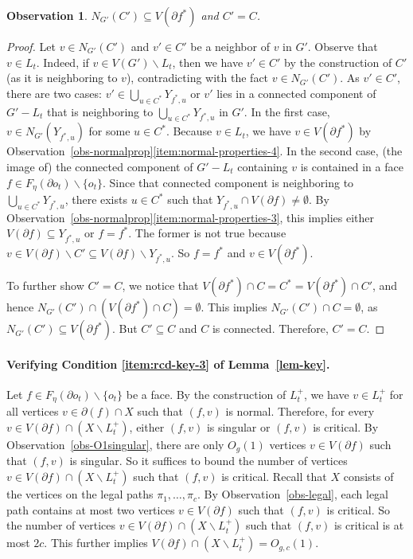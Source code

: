 \documentclass[a4paper,11pt]{article}
\numberwithin{lemma}{section}
\newtheorem{observation}[lemma]{Observation}
\begin{document}
\begin{observation}
$N_{G'}(C') \subseteq V(\partial f^*)$ and $C' = C$.
\end{observation}
\begin{proof}
Let $v \in N_{G'}(C')$ and $v' \in C'$ be a neighbor of $v$ in $G'$.
Observe that $v \in L_t$.
Indeed, if $v \in V(G') \backslash L_t$, then we have $v' \in C'$ by the construction of $C'$ (as it is neighboring to $v$), contradicting with the fact $v \in N_{G'}(C')$.
As $v' \in C'$, there are two cases: $v' \in \bigcup_{u \in C^*} Y_{f^*,u}$ or $v'$ lies in a connected component of $G' - L_t$ that is neighboring to $\bigcup_{u \in C^*} Y_{f^*,u}$ in $G'$.
In the first case, $v \in N_{G'}(Y_{f^*,u})$ for some $u \in C^*$.
Because $v \in L_t$, we have $v \in V(\partial f^*)$ by Observation~\ref{obs-normalprop}\ref{item:normal-properties-4}.
In the second case, (the image of) the connected component of $G' - L_t$ containing $v$ is contained in a face $f \in F_\eta(\partial o_t) \backslash \{o_t\}$.
Since that connected component is neighboring to $\bigcup_{u \in C^*} Y_{f^*,u}$, there exists $u \in C^*$ such that $Y_{f^*,u} \cap V(\partial f) \neq \emptyset$.
By Observation~\ref{obs-normalprop}\ref{item:normal-properties-3}, this implies either $V(\partial f) \subseteq Y_{f^*,u}$ or $f = f^*$.
The former is not true because $v \in V(\partial f) \backslash C' \subseteq V(\partial f) \backslash Y_{f^*,u}$.
So $f = f^*$ and $v \in V(\partial f^*)$.

To further show $C' = C$, we notice that $V(\partial f^*) \cap C = C^* = V(\partial f^*) \cap C'$, and hence $N_{G'}(C') \cap (V(\partial f^*) \cap C) = \emptyset$.
This implies $N_{G'}(C') \cap C = \emptyset$, as $N_{G'}(C') \subseteq V(\partial f^*)$.
But $C' \subseteq C$ and $C$ is connected.
Therefore, $C' = C$.
\end{proof}

\paragraph{Verifying Condition \ref{item:rcd-key-3} of Lemma~\ref{lem-key}.}
Let $f \in F_\eta(\partial o_t) \backslash \{o_t\}$ be a face.
By the construction of $L_t^+$, we have $v \in L_t^+$ for all vertices $v \in \partial (f) \cap X$ such that $(f,v)$ is normal.
Therefore, for every $v \in V(\partial f) \cap (X \backslash L_t^+)$, either $(f,v)$ is singular or $(f,v)$ is critical.
By Observation~\ref{obs-O1singular}, there are only $O_g(1)$ vertices $v \in V(\partial f)$ such that $(f,v)$ is singular.
So it suffices to bound the number of vertices $v \in V(\partial f) \cap (X \backslash L_t^+)$ such that $(f,v)$ is critical.
Recall that $X$ consists of the vertices on the legal paths $\pi_1,\dots,\pi_c$.
By Observation~\ref{obs-legal}, each legal path contains at most two vertices $v \in V(\partial f)$ such that $(f,v)$ is critical.
So the number of vertices $v \in V(\partial f) \cap (X \backslash L_t^+)$ such that $(f,v)$ is critical is at most $2c$.
This further implies $V(\partial f) \cap (X \backslash L_t^+) = O_{g,c}(1)$.
\end{document}
